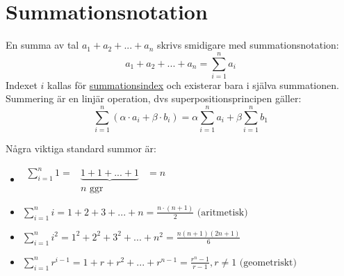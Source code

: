 \chapter{Summationsnotation}
En summa av tal $a_1+a_2+...+a_n$ skrivs smidigare med summationsnotation:
\begin{equation*}
    a_1+a_2+...+a_n=\sum^n_{i=1} a_i
\end{equation*}
Indexet $i$ kallas för \underline{summationsindex} och existerar bara i själva summationen.
Summering är en linjär operation, dvs superpositionsprincipen gäller:
\begin{equation*}
    \sum_{i=1}^n(\alpha\cdot a_i+\beta\cdot b_i)=\alpha\sum_{i=1}^n a_i + \beta\sum_{i=1}^n b_1
\end{equation*}

Några viktiga standard summor är:
\begin{itemize}
    \item $\begin{matrix}
                  \sum_{i=1}^n 1= & \underbrace{1+1+...+1} & =n \\
                                  & n\text{ ggr}           &
              \end{matrix}$
    \item $\sum_{i=1}^n i=1+2+3+...+n=\frac{n\cdot(n+1)}{2}\text{ (aritmetisk)}$
    \item $\sum_{i=1}^n i^2=1^2+2^2+3^2+...+n^2=\frac{n(n+1)(2n+1)}{6}$
    \item $\sum_{i=1}^n r^{i-1}=1+r+r^2+...+r^{n-1}=\frac{r^n -1}{r-1},r\neq 1 \text{ (geometriskt)}$
\end{itemize}

